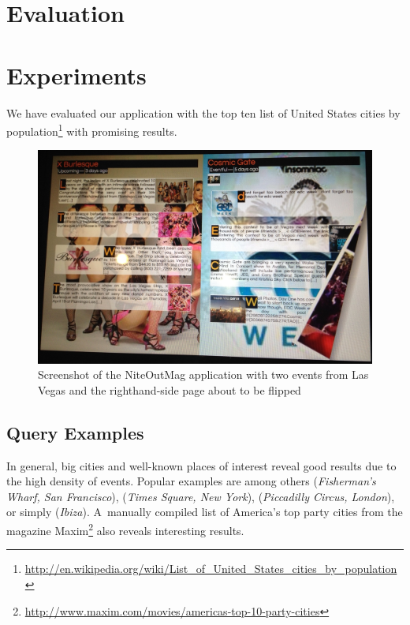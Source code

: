 \documentclass[runningheads,a4paper]{llncs}
\begin{document}
{\section{Evaluation}



\section{Experiments}                                                       \label{sec:experiments}
We have evaluated our application with the top ten list of United States cities by population\footnote{\url{http://en.wikipedia.org/wiki/List_of_United_States_cities_by_population}} with promising results.

\begin{figure}[b!]
\centering
\includegraphics[width=1.0\columnwidth]{./screenshot.jpg}
\caption{Screenshot of the NiteOutMag application with two events from Las Vegas and the righthand-side page about to be flipped}
\label{fig:screenshot}
\end{figure}

\subsection{Query Examples}
In general, big cities and well-known places of interest reveal good results due to the high density of events. Popular examples are among others (\emph{Fisherman's Wharf, San Francisco}), (\emph{Times Square, New York}), (\emph{Piccadilly Circus, London}), or simply (\emph{Ibiza}). A~manually compiled list of America's top party cities from the magazine Maxim\footnote{\url{http://www.maxim.com/movies/americas-top-10-party-cities}} also reveals interesting results.

}
\end{document}
